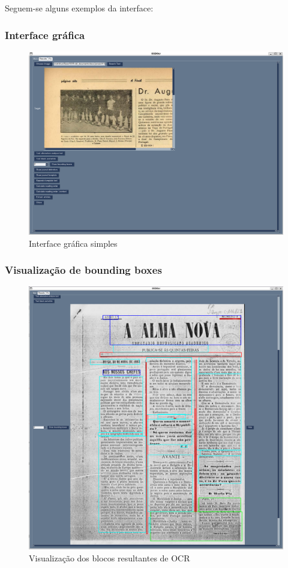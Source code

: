 Seguem-se alguns exemplos da interface:

\subsubsection{Interface gráfica}

\begin{figure}[H]
    \centering
    \includegraphics[width=1\textwidth]{images/implementacao/gui/gui_base.png}
    \caption{Interface gráfica simples}
    \label{fig:gui_base}
\end{figure}

\subsubsection{Visualização de bounding boxes}

\begin{figure}[H]
    \centering
    \includegraphics[width=1\textwidth]{images/implementacao/gui/gui_draw_bb.png}
    \caption{Visualização dos blocos resultantes de OCR}
    \label{fig:gui_draw_bb}
\end{figure}

